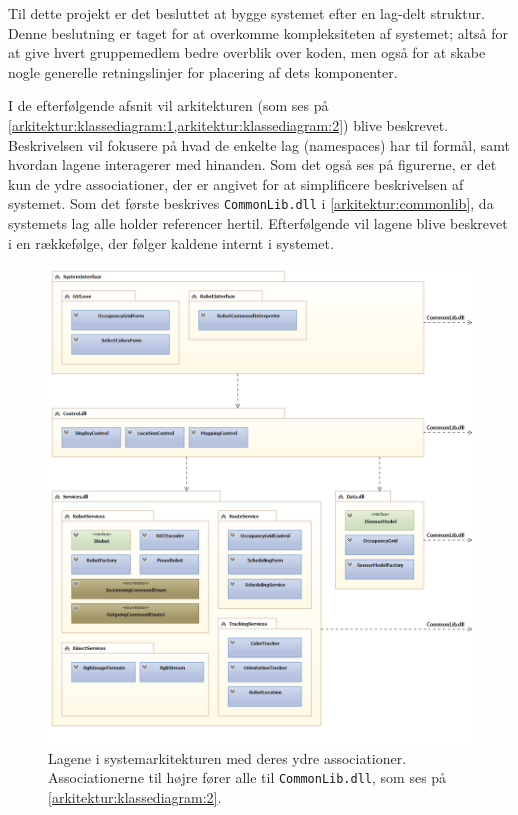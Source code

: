\label{arkitektur}
Til dette projekt er det besluttet at bygge systemet efter en lag-delt struktur.
Denne beslutning er taget for at overkomme kompleksiteten af systemet; altså for at give hvert gruppemedlem bedre overblik over koden, men også for at skabe nogle generelle retningslinjer for placering af dets komponenter.

I de efterfølgende afsnit vil arkitekturen (som ses på  \cref{arkitektur:klassediagram:1,arkitektur:klassediagram:2}) blive beskrevet.
Beskrivelsen vil fokusere på hvad de enkelte lag (namespaces) har til formål, samt hvordan lagene interagerer med hinanden.
Som det også ses på figurerne, er det kun de ydre associationer, der er angivet for at simplificere beskrivelsen af systemet.
Som det første beskrives \lstinline[style=csharp]!CommonLib.dll! i \cref{arkitektur:commonlib}, da systemets lag alle holder referencer hertil.
Efterfølgende vil lagene blive beskrevet i en rækkefølge, der følger kaldene internt i systemet.
\begin{figure}
\centering
\includegraphics[width=1\textwidth]{./graphics/systemarkitektur_1}
\caption{Lagene i systemarkitekturen med deres ydre associationer. Associationerne til højre fører alle til \lstinline[style=csharp]!CommonLib.dll!, som ses på \cref{arkitektur:klassediagram:2}.}
\label{arkitektur:klassediagram:1}
\end{figure}

